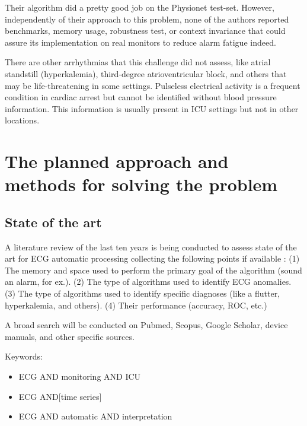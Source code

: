\documentclass[
]{article}
\providecommand{\tightlist}{%
  \setlength{\itemsep}{0pt}\setlength{\parskip}{0pt}}
\begin{document}
Their algorithm did a pretty good job on the Physionet test-set.
However, independently of their approach to this problem, none of the
authors reported benchmarks, memory usage, robustness test, or context
invariance that could assure its implementation on real monitors to
reduce alarm fatigue indeed.

There are other arrhythmias that this challenge did not assess, like
atrial standstill (hyperkalemia), third-degree atrioventricular block,
and others that may be life-threatening in some settings. Pulseless
electrical activity is a frequent condition in cardiac arrest but cannot
be identified without blood pressure information. This information is
usually present in ICU settings but not in other locations.

\hypertarget{the-planned-approach-and-methods-for-solving-the-problem}{%
\section{The planned approach and methods for solving the
problem}\label{the-planned-approach-and-methods-for-solving-the-problem}}

\hypertarget{state-of-the-art}{%
\subsection{State of the art}\label{state-of-the-art}}

A literature review of the last ten years is being conducted to assess
state of the art for ECG automatic processing collecting the following
points if available : (1) The memory and space used to perform the
primary goal of the algorithm (sound an alarm, for ex.). (2) The type of
algorithms used to identify ECG anomalies. (3) The type of algorithms
used to identify specific diagnoses (like a flutter, hyperkalemia, and
others). (4) Their performance (accuracy, ROC, etc.)

A broad search will be conducted on Pubmed, Scopus, Google Scholar,
device manuals, and other specific sources.

Keywords:

\begin{itemize}
\tightlist
\item
  ECG AND monitoring AND ICU
\item
  ECG AND{[}time series{]}
\item
  ECG AND automatic AND interpretation
\end{itemize}
\end{document}
